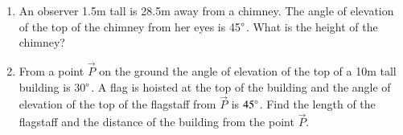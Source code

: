 \begin{enumerate}[label=\arabic*.,ref=\thesubsection.\theenumi]
%
\item An observer 1.5m tall is 28.5m away from a chimney.  The angle of elevation of the top of the chimney from her eyes is 45$\degree$.  What is the height of the chimney?
%
%
\item From a point $\vec{P}$ on the ground the angle of elevation of the top of a 10m tall building is 30$\degree$.  A flag is hoisted at the top of the building and the angle of elevation of the top of the flagstaff from $\vec{P}$ is $45\degree$.  Find the length of the flagstaff and the distance of the building from the point $\vec{P}$.
%

\end{enumerate}
